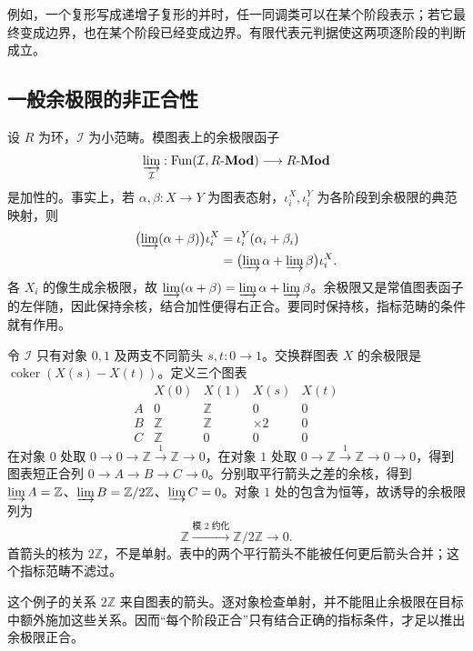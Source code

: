 例如，一个复形写成递增子复形的并时，任一同调类可以在某个阶段表示；若它最终变成边界，也在某个阶段已经变成边界。有限代表元判据使这两项逐阶段的判断成立。

\subsection{一般余极限的非正合性}
\label{b4:subsec:1301:02}

设 \(R\) 为环，\(\mathcal I\) 为小范畴。模图表上的余极限函子
\[
	\varinjlim_{\mathcal I}: \operatorname{Fun}(\mathcal I,R\text{-}\mathbf{Mod}) \longrightarrow R\text{-}\mathbf{Mod}
\]
是加性的。事实上，若 \(\alpha,\beta:X\to Y\) 为图表态射，\(\iota_i^X,\iota_i^Y\) 为各阶段到余极限的典范映射，则
\[
	\begin{aligned}
		\bigl(\varinjlim(\alpha+\beta)\bigr)\iota_i^X &=\iota_i^Y(\alpha_i+\beta_i)\\
		&=\bigl(\varinjlim\alpha+\varinjlim\beta\bigr)\iota_i^X.
	\end{aligned}
\]
各 \(X_i\) 的像生成余极限，故 \(\varinjlim(\alpha+\beta)=\varinjlim\alpha+\varinjlim\beta\)。余极限又是常值图表函子的左伴随，因此保持余核，结合加性便得右正合。要同时保持核，指标范畴的条件就有作用。

\begin{example}\label{b4:exm:parallel-colimit-not-exact}
	令 \(\mathcal I\) 只有对象 \(0,1\) 及两支不同箭头 \(s,t:0\to1\)。交换群图表 \(X\) 的余极限是 \(\operatorname{coker}(X(s)-X(t))\)。定义三个图表
	\[
		\begin{array}{c|cc|cc}
			&X(0)&X(1)&X(s)&X(t)\\\hline A&0&\mathbb Z&0&0\\
			B&\mathbb Z&\mathbb Z&\times2&0\\
			C&\mathbb Z&0&0&0
		\end{array}
	\]
	在对象 \(0\) 处取 \(0\to0\to\mathbb Z\xrightarrow{1}\mathbb Z\to0\)，在对象 \(1\) 处取 \(0\to\mathbb Z\xrightarrow{1}\mathbb Z\to0\to0\)，得到图表短正合列 \(0\to A\to B\to C\to0\)。分别取平行箭头之差的余核，得到 \(\varinjlim A=\mathbb Z\)、\(\varinjlim B=\mathbb Z/2\mathbb Z\)、\(\varinjlim C=0\)。对象 \(1\) 处的包含为恒等，故诱导的余极限列为
	\[
		\mathbb Z\xrightarrow{\text{模 }2\text{ 约化}}\mathbb Z/2\mathbb Z\longrightarrow0.
	\]
	首箭头的核为 \(2\mathbb Z\)，不是单射。表中的两个平行箭头不能被任何更后箭头合并；这个指标范畴不滤过。
\end{example}

这个例子的关系 \(2\mathbb Z\) 来自图表的箭头。逐对象检查单射，并不能阻止余极限在目标中额外施加这些关系。因而“每个阶段正合”只有结合正确的指标条件，才足以推出余极限正合。

